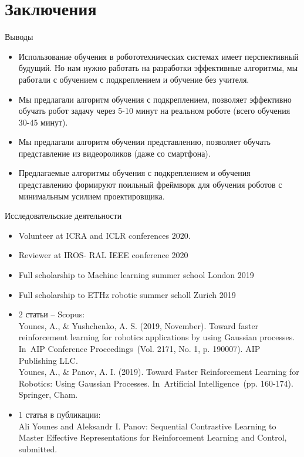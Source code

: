 \documentclass{beamer}
\begin{document}
\section{Заключения}
\begin{frame}{Выводы}
\begin{itemize}
    \item <1> Использование обучения в робототехнических системах имеет перспективный будущий. Но нам нужно работать на разработки эффективные алгоритмы, мы работали с обучением с подкреплением и обучение без учителя.
    \item <2> Мы предлагали алгоритм обучения с подкреплением, позволяет эффективно обучать робот задачу через 5-10 минут на реальном роботе (всего обучения 30-45 минут).
    \item <3> Мы предлагали алгоритм обучении представлению, позволяет обучать представление из видеороликов (даже со смартфона).
    \item <4> Предлагаемые алгоритмы обучения с подкреплением и обучения представлению формируют поильный фреймворк для обучения роботов с минимальным усилием проектировщика.
\end{itemize}
\end{frame}
\begin{frame}{Исследовательские деятельности}
\begin{itemize}
    \item Volunteer at ICRA and ICLR conferences 2020.
    \item Reviewer at IROS- RAL IEEE conference 2020
    \item Full scholarship to Machine learning summer school London 2019
    \item Full scholarship to ETHz robotic summer scholl Zurich 2019
    \item 2 статьи – Scopus:\\
    Younes, A., & Yushchenko, A. S. (2019, November). Toward faster reinforcement learning for robotics applications by using Gaussian processes. In AIP Conference Proceedings (Vol. 2171, No. 1, p. 190007). AIP Publishing LLC.\\
    Younes, A., & Panov, A. I. (2019). Toward Faster Reinforcement Learning for Robotics: Using Gaussian Processes. In Artificial Intelligence (pp. 160-174). Springer, Cham.
    \item 1 статья в публикации:\\
    Ali Younes and Aleksandr I. Panov: Sequential Contrastive Learning to Master Effective Representations for Reinforcement Learning and Control, submitted.
\end{itemize}
\end{frame}
\end{document}

